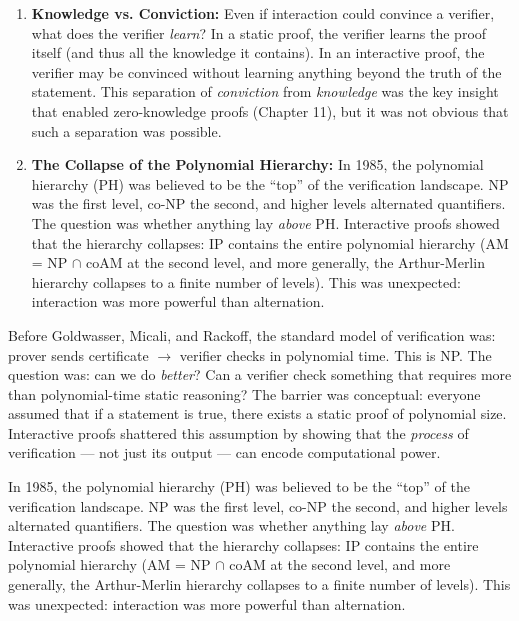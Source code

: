\begin{enumerate}
\item \textbf{Knowledge vs. Conviction:} Even if interaction could convince a verifier, what does the verifier \emph{learn}? In a static proof, the verifier learns the proof itself (and thus all the knowledge it contains). In an interactive proof, the verifier may be convinced without learning anything beyond the truth of the statement. This separation of \emph{conviction} from \emph{knowledge} was the key insight that enabled zero-knowledge proofs (Chapter 11), but it was not obvious that such a separation was possible.

\item \textbf{The Collapse of the Polynomial Hierarchy:} In 1985, the polynomial hierarchy (PH) was believed to be the ``top'' of the verification landscape. NP was the first level, co-NP the second, and higher levels alternated quantifiers. The question was whether anything lay \emph{above} PH. Interactive proofs showed that the hierarchy collapses: IP contains the entire polynomial hierarchy (AM = NP $\cap$ coAM at the second level, and more generally, the Arthur-Merlin hierarchy collapses to a finite number of levels). This was unexpected: interaction was more powerful than alternation.
\end{enumerate}

Before Goldwasser, Micali, and Rackoff, the standard model of verification was: prover sends certificate $\to$ verifier checks in polynomial time. This is NP. The question was: can we do \emph{better}? Can a verifier check something that requires more than polynomial-time static reasoning? The barrier was conceptual: everyone assumed that if a statement is true, there exists a static proof of polynomial size. Interactive proofs shattered this assumption by showing that the \emph{process} of verification --- not just its output --- can encode computational power.

In 1985, the polynomial hierarchy (PH) was believed to be the ``top'' of the verification landscape. NP was the first level, co-NP the second, and higher levels alternated quantifiers. The question was whether anything lay \emph{above} PH. Interactive proofs showed that the hierarchy collapses: IP contains the entire polynomial hierarchy (AM = NP $\cap$ coAM at the second level, and more generally, the Arthur-Merlin hierarchy collapses to a finite number of levels). This was unexpected: interaction was more powerful than alternation.

